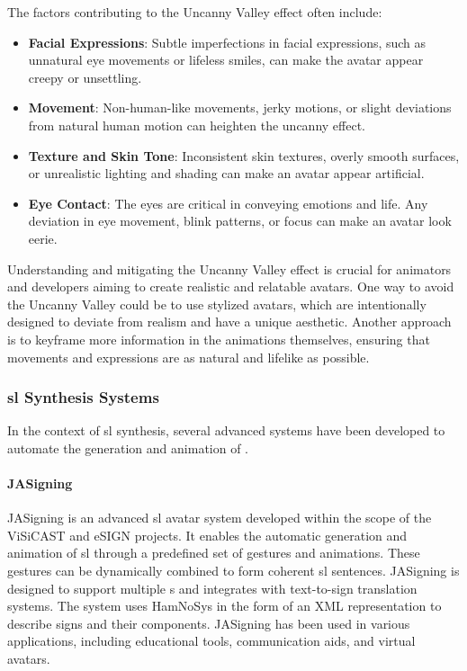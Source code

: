 \documentclass[../../main.tex]{subfiles}
\begin{document}
The factors contributing to the Uncanny Valley effect often include:

\begin{itemize}
  \item \textbf{Facial Expressions}: Subtle imperfections in facial expressions, such as unnatural eye movements or lifeless smiles, can make the avatar appear creepy or unsettling.
  \item \textbf{Movement}: Non-human-like movements, jerky motions, or slight deviations from natural human motion can heighten the uncanny effect.
  \item \textbf{Texture and Skin Tone}: Inconsistent skin textures, overly smooth surfaces, or unrealistic lighting and shading can make an avatar appear artificial.
  \item \textbf{Eye Contact}: The eyes are critical in conveying emotions and life. Any deviation in eye movement, blink patterns, or focus can make an avatar look eerie.
\end{itemize}

Understanding and mitigating the Uncanny Valley effect is crucial for animators and developers aiming to create realistic and relatable avatars. One way to avoid the Uncanny Valley could be to use stylized avatars, which are intentionally designed to deviate from realism and have a unique aesthetic. Another approach is to keyframe more information in the animations themselves, ensuring that movements and expressions are as natural and lifelike as possible.

\subsubsection{\gls{sl} Synthesis Systems}
\label{ch:background_work:sign_language_synthesis:3d_techniques:sign_language_synthesis_systems}

In the context of \gls{sl} synthesis, several advanced systems have been developed to automate the generation and animation of .

\paragraph{JASigning}
\label{ch:background_work:sign_language_synthesis:3d_techniques:sign_language_synthesis_systems:jasigning}

JASigning is an advanced \gls{sl} avatar system developed within the scope of the ViSiCAST and eSIGN projects. It enables the automatic generation and animation of \gls{sl} through a predefined set of gestures and animations. These gestures can be dynamically combined to form coherent \gls{sl} sentences. JASigning is designed to support multiple s and integrates with text-to-sign translation systems. The system uses HamNoSys in the form of an XML representation to describe signs and their components. JASigning has been used in various applications, including educational tools, communication aids, and virtual avatars.
\end{document}
